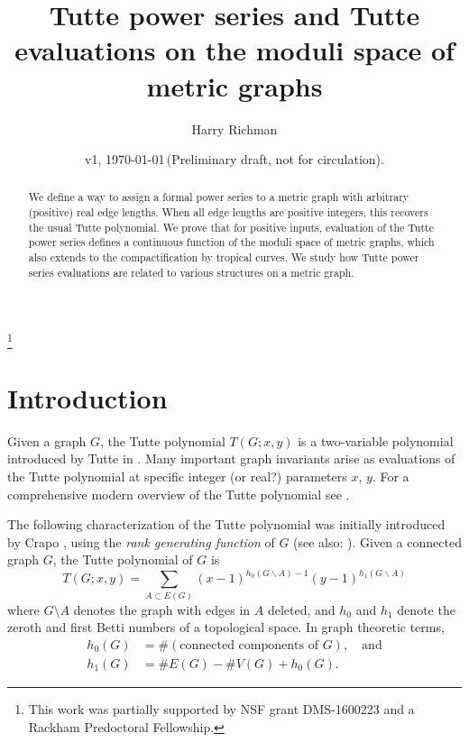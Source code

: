 \documentclass{amsart}
\theoremstyle{definition}
\begin{document}
\title[Tutte power series on metric graphs]{Tutte power series and Tutte evaluations on the moduli space of metric graphs}
\author{Harry Richman}
\date{v1, \today  \,(Preliminary draft, not for circulation).}
\thanks{This work was partially supported by NSF grant DMS-1600223
and a Rackham Predoctoral Fellowship.}


\begin{abstract}
We define a way to assign a formal power series to a metric graph with arbitrary
(positive) real edge lengths.
When all edge lengths are positive integers,
this recovers the usual Tutte polynomial.
We prove that for positive inputs, evaluation of the Tutte power series
defines a continuous function of the moduli space of metric graphs,
which also extends to the compactification by tropical curves.
We study how Tutte power series evaluations are
related to various structures on a metric graph.
\end{abstract}
\maketitle


\section{Introduction}
Given a graph $G$,
the Tutte polynomial $T(G;x,y)$ 
is 
 a two-variable polynomial %
introduced by Tutte in \cite{Tut}.
Many important graph invariants arise as evaluations of 
the Tutte polynomial %
at specific integer (or real?) parameters $x$, $y$.
For a comprehensive modern overview of the Tutte polynomial see \cite{BO} \cite{EMM}.

The following characterization of the Tutte polynomial was initially introduced by Crapo \cite{Cra}, 
using the  {\em rank generating function} of $G$
(see also: \cite[Definition 3]{EMM}).
Given a connected graph $G $, 
the Tutte polynomial of $G$ is 
\begin{equation}
\label{eq:tutte-graph}
T(G; x,y) = \sum_{A \subset E(G)} (x-1)^{h_0(G\backslash A) - 1}(y-1)^{h_1(G\backslash A)}
\end{equation}
where $G\setminus A$ denotes the graph with edges in $A$ deleted,
and $h_0$ and $h_1$ denote the zeroth and first Betti numbers of 
a topological space.
In graph theoretic terms,
\begin{align*}
h_0(G) &= \#(\text{connected components of }G), \quad\text{and}\\
h_1(G) &= \# E(G) - \# V(G) + h_0(G) .
\end{align*}
\end{document}
